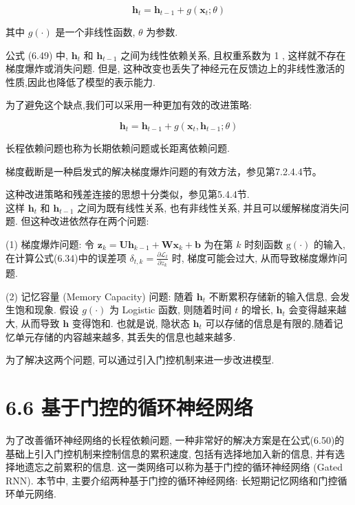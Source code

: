 \documentclass[10pt]{article}
\begin{document}
\begin{equation*}
\boldsymbol{h}_{t}=\boldsymbol{h}_{t-1}+g\left(\boldsymbol{x}_{t} ; \theta\right) \tag{6.49}
\end{equation*}


其中 $g(\cdot)$ 是一个非线性函数, $\theta$ 为参数.

公式 (6.49) 中, $\boldsymbol{h}_{t}$ 和 $\boldsymbol{h}_{t-1}$ 之间为线性依赖关系, 且权重系数为 1 , 这样就不存在梯度爆炸或消失问题. 但是, 这种改变也丢失了神经元在反馈边上的非线性激活的性质,因此也降低了模型的表示能力.

为了避免这个缺点,我们可以采用一种更加有效的改进策略:


\begin{equation*}
\boldsymbol{h}_{t}=\boldsymbol{h}_{t-1}+g\left(\boldsymbol{x}_{t}, \boldsymbol{h}_{t-1} ; \theta\right) \tag{6.50}
\end{equation*}


长程依赖问题也称为长期依赖问题或长距离依赖问题.

梯度截断是一种启发式的解决梯度爆炸问题的有效方法，参见第7.2.4.4节。

这种改进策略和残差连接的思想十分类似，参见第5.4.4节.\\
这样 $\boldsymbol{h}_{t}$ 和 $\boldsymbol{h}_{t-1}$ 之间为既有线性关系, 也有非线性关系, 并且可以缓解梯度消失问题. 但这种改进依然存在两个问题:

(1) 梯度爆炸问题: 令 $\boldsymbol{z}_{k}=\boldsymbol{U} \boldsymbol{h}_{k-1}+\boldsymbol{W} \boldsymbol{x}_{k}+\boldsymbol{b}$ 为在第 $k$ 时刻函数 $\mathrm{g}(\cdot)$ 的输入, 在计算公式(6.34)中的误差项 $\delta_{t, k}=\frac{\partial \mathcal{L}_{t}}{\partial z_{k}}$ 时, 梯度可能会过大, 从而导致梯度爆炸问题.

(2) 记忆容量 (Memory Capacity) 问题: 随着 $\boldsymbol{h}_{t}$ 不断累积存储新的输入信息, 会发生饱和现象. 假设 $g(\cdot)$ 为 Logistic 函数, 则随着时间 $t$ 的增长, $\boldsymbol{h}_{t}$ 会变得越来越大, 从而导致 $\boldsymbol{h}$ 变得饱和. 也就是说, 隐状态 $\boldsymbol{h}_{t}$ 可以存储的信息是有限的,随着记忆单元存储的内容越来越多, 其丢失的信息也越来越多.

为了解决这两个问题, 可以通过引入门控机制来进一步改进模型.

\section*{6.6 基于门控的循环神经网络}
为了改善循环神经网络的长程依赖问题, 一种非常好的解决方案是在公式(6.50)的基础上引入门控机制来控制信息的累积速度, 包括有选择地加入新的信息, 并有选择地遗忘之前累积的信息. 这一类网络可以称为基于门控的循环神经网络 (Gated RNN). 本节中, 主要介绍两种基于门控的循环神经网络: 长短期记忆网络和门控循环单元网络.
\end{document}
